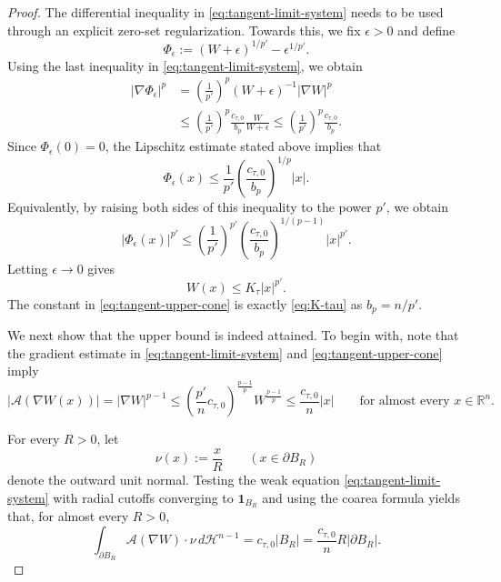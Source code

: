 \documentclass[10pt,a4paper]{amsart}
\newcommand{\Acal}{\mathcal A}
\newcommand{\R}{\mathbb R}
\newcommand{\dd}{\,d}
\begin{document}
\begin{proof}
The differential inequality in \eqref{eq:tangent-limit-system} needs to be used through an explicit zero-set regularization.  Towards this, we fix $\epsilon>0$ and define
$$
\Phi_\epsilon := (W+\epsilon)^{1/p'} -\epsilon^{1/p'}.
$$
Using the last inequality in
\eqref{eq:tangent-limit-system}, we obtain
\begin{align*}
|\nabla\Phi_\epsilon|^p &=\left(\frac 1 {p'}\right)^p (W+\epsilon)^{-1}|\nabla W|^p\\
&\le\left(\frac 1 {p'} \right)^p \frac{c_{\tau,0}}{b_p} \frac{W}{W+\epsilon} \le \left(\frac1{p'}\right)^p \frac{c_{\tau,0}}{b_p}.
\end{align*}
Since $\Phi_\epsilon(0)=0$, the Lipschitz estimate stated above implies that
$$
\Phi_\epsilon(x) \le \frac{1}{p'}\left(\frac{c_{\tau,0}}{b_p}\right)^{1/p}\lvert x\rvert.
$$
Equivalently, by raising both sides of this inequality to the power $p'$, we obtain
$$
\lvert \Phi_\epsilon(x)\rvert^{p'} \le \left(\frac{1}{p'}\right)^{p'}\left(\frac{c_{\tau,0}}{b_p}\right)^{1/(p-1)}\lvert x\rvert^{p'}.
$$
Letting $\epsilon\to 0$ gives
\begin{equation}\label{eq:tangent-upper-cone}
W(x)\le K_\tau|x|^{p'}.
\end{equation}
The constant in \eqref{eq:tangent-upper-cone} is exactly
\eqref{eq:K-tau} as $b_p=n/p'$.

We next show that the upper bound is indeed attained. To begin with, note that the  gradient estimate in \eqref{eq:tangent-limit-system} and \eqref{eq:tangent-upper-cone} imply
\begin{equation}\label{eq:tangent-stress-bound}
|\Acal(\nabla W(x))|=|\nabla W|^{p-1}\le \left(\frac{p'}{n} c_{\tau,0}\right)^{\frac {p-1}{p}} W^{\frac {p-1}{p}} \le\frac{c_{\tau,0}}n|x| \qquad\text{for almost every } x\in \R^n.
\end{equation}

For every $R>0$, let
$$
\nu(x):=\frac{x}{R} \qquad (x\in\partial B_R)
$$
denote the outward unit normal.
Testing the weak equation \eqref{eq:tangent-limit-system} with radial cutoffs converging to $\mathbf1_{B_R}$ and using the coarea formula yields that, for almost every $R>0$,
\begin{equation}\label{eq:tangent-flux}
 \int_{\partial B_R}\Acal(\nabla W)\cdot\nu\dd \mathcal H^{n-1}
 =c_{\tau,0}|B_R|  =\frac{c_{\tau,0}}nR|\partial B_R|.
\end{equation}



\end{proof}
\end{document}
